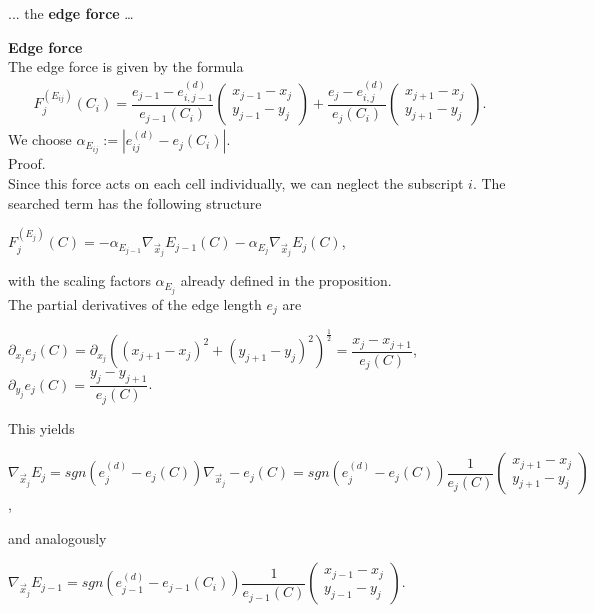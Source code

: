 ... the \textbf{edge force} \dots
\begin{proposition} \textbf{Edge force} \\
	The edge force is given by the formula
	\begin{align}
		F^{(E_{ij})}_j(C_i) = \dfrac{e_{j-1} - e_{i, j-1}^{(d)}}{e_{j-1}(C_i) } \begin{pmatrix} x_{j-1} - x_j \\ y_{j-1} - y_j\end{pmatrix} + 
		\dfrac{e_{j} - e_{i, j}^{(d)}}{e_{j}(C_i)} \begin{pmatrix} x_{j+1} - x_j \\ y_{j+1} - y_j\end{pmatrix}.
	\end{align}
	We choose $\alpha_{E_{ij}} := | e_{ij}^{(d)} - e_j(C_i) |$. \\
	Proof. \\
	Since this force acts on each cell individually, we can neglect the subscript $i$.
	The searched term has the following structure
	\begin{center}
		$F^{(E_{j})}_j(C) = - \alpha_{E_{j-1}} \nabla_{\vec{x}_j} E_{j-1}(C) - \alpha_{E_{j}} \nabla_{\vec{x}_j} E_{j}(C)$,
	\end{center}
	with the scaling factors $\alpha_{E_j}$ already defined in the proposition. \\	
	The partial derivatives of the edge length $e_j$ are
	\begin{center}
		$\partial_{x_j} e_j(C) = \partial_{x_j} ( (x_{j+1}- x_j)^2 + (y_{j+1} - y_j)^2)^{\frac{1}{2}} = \dfrac{ x_j - x_{j+1} }{ e_j(C) }$, \\
		$\partial_{y_j} e_j(C) = \dfrac{ y_j - y_{j+1} }{ e_j(C) }$. \\
	\end{center}
	This yields
	\begin{center}
		$ \nabla_{\vec{x}_j} E_{j} = sgn(e_{j}^{(d)} - e_j(C)) \nabla_{\vec{x}_j} - e_j(C)  = sgn(e_{j}^{(d)} - e_j(C))  \dfrac{1}{  e_j(C) } \begin{pmatrix} x_{j+1} - x_j \\ 	y_{j+1} - y_j \end{pmatrix}$,
	\end{center}
	and analogously
	\begin{center}
		$\nabla_{\vec{x}_j} E_{j-1} = sgn(e_{j-1}^{(d)} - e_{j-1}(C_i))  \dfrac{1}{  e_{j-1}(C) } \begin{pmatrix} x_{j-1} - x_j \\ 	y_{j-1} - y_j \end{pmatrix}$. 

\end{center}
\end{proposition}
